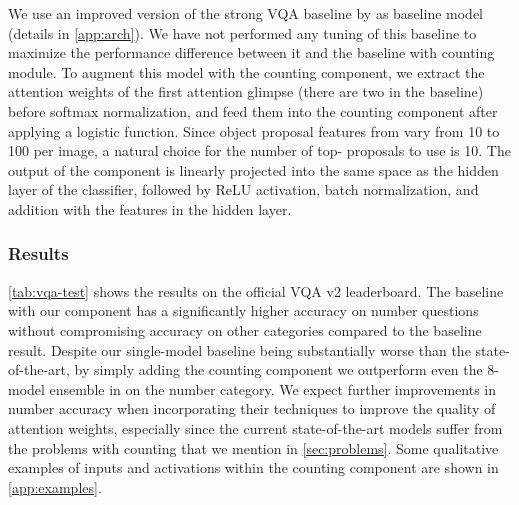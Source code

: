 \documentclass[letterpaper]{article}
\begin{document}
We use an improved version of the strong VQA baseline by \citet{Kazemi2017a} as baseline model (details in \autoref{app:arch}).
We have not performed any tuning of this baseline to maximize the performance difference between it and the baseline with counting module.
To augment this model with the counting component, we extract the attention weights of the first attention glimpse (there are two in the baseline) before softmax normalization, and feed them into the counting component after applying a logistic function.
Since object proposal features from \citet{Anderson2017a} vary from 10 to 100 per image, a natural choice for the number of top- proposals to use is 10.
The output of the component is linearly projected into the same space as the hidden layer of the classifier, followed by ReLU activation, batch normalization, and addition with the features in the hidden layer.

\subsubsection{Results}
\autoref{tab:vqa-test} shows the results on the official VQA v2 leaderboard.
The baseline with our component has a significantly higher accuracy on number questions without compromising accuracy on other categories compared to the baseline result.
Despite our single-model baseline being substantially worse than the state-of-the-art, by simply adding the counting component we outperform even the 8-model ensemble in \citet{Zhou2017a} on the number category.
We expect further improvements in number accuracy when incorporating their techniques to improve the quality of attention weights, especially since the current state-of-the-art models suffer from the problems with counting that we mention in \autoref{sec:problems}.
Some qualitative examples of inputs and activations within the counting component are shown in \autoref{app:examples}.
\end{document}
